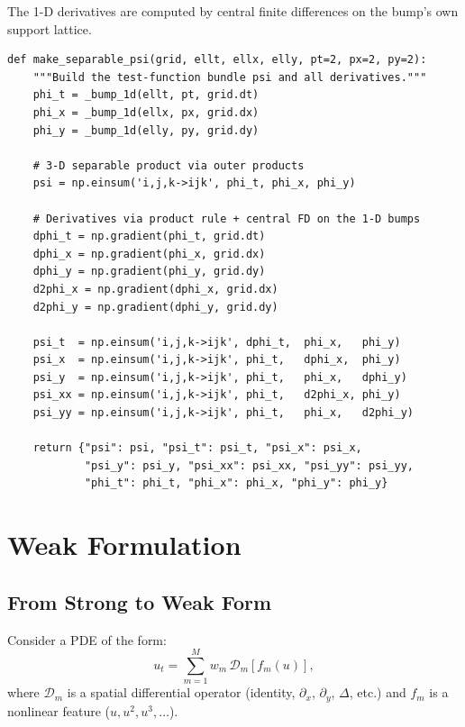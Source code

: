 \documentclass[11pt]{article}
\begin{document}
The 1-D derivatives are computed by central finite differences on the
bump's own support lattice.

\begin{lstlisting}[caption={test\_functions.py --- make\_separable\_psi}]
def make_separable_psi(grid, ellt, ellx, elly, pt=2, px=2, py=2):
    """Build the test-function bundle psi and all derivatives."""
    phi_t = _bump_1d(ellt, pt, grid.dt)
    phi_x = _bump_1d(ellx, px, grid.dx)
    phi_y = _bump_1d(elly, py, grid.dy)

    # 3-D separable product via outer products
    psi = np.einsum('i,j,k->ijk', phi_t, phi_x, phi_y)

    # Derivatives via product rule + central FD on the 1-D bumps
    dphi_t = np.gradient(phi_t, grid.dt)
    dphi_x = np.gradient(phi_x, grid.dx)
    dphi_y = np.gradient(phi_y, grid.dy)
    d2phi_x = np.gradient(dphi_x, grid.dx)
    d2phi_y = np.gradient(dphi_y, grid.dy)

    psi_t  = np.einsum('i,j,k->ijk', dphi_t,  phi_x,   phi_y)
    psi_x  = np.einsum('i,j,k->ijk', phi_t,   dphi_x,  phi_y)
    psi_y  = np.einsum('i,j,k->ijk', phi_t,   phi_x,   dphi_y)
    psi_xx = np.einsum('i,j,k->ijk', phi_t,   d2phi_x, phi_y)
    psi_yy = np.einsum('i,j,k->ijk', phi_t,   phi_x,   d2phi_y)

    return {"psi": psi, "psi_t": psi_t, "psi_x": psi_x,
            "psi_y": psi_y, "psi_xx": psi_xx, "psi_yy": psi_yy,
            "phi_t": phi_t, "phi_x": phi_x, "phi_y": phi_y}
\end{lstlisting}


\section{Weak Formulation}
\label{sec:weak}

\subsection{From Strong to Weak Form}

Consider a PDE of the form:
\begin{equation}\label{eq:strong}
  u_t = \sum_{m=1}^M w_m\, \mathcal{D}_m[f_m(u)],
\end{equation}
where $\mathcal{D}_m$ is a spatial differential operator (identity,
$\partial_x$, $\partial_y$, $\Delta$, etc.) and $f_m$ is a nonlinear
feature ($u, u^2, u^3, \ldots$).
\end{document}
